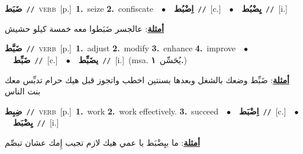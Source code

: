 \documentclass[10pt,a4paper,twoside]{article} %
\begin{document}
\begin{multicols}{2}
{\setlength\topsep{0pt}\textbf{\foreignlanguage{arabic}{ضَبَط}}\ {\color{gray}\texttt{//}\color{black}}\ \textsc{verb}\ [p.]\ \textbf{1.}~seize  \textbf{2.}~confiscate\ \ $\bullet$\ \ \setlength\topsep{0pt}\textbf{\foreignlanguage{arabic}{اِضْبُط}}\ {\color{gray}\texttt{//}\color{black}}\ [c.]\ \ $\bullet$\ \ \setlength\topsep{0pt}\textbf{\foreignlanguage{arabic}{يِضْبُط}}\ {\color{gray}\texttt{//}\color{black}}\ [i.]\  \begin{flushright}\color{gray}\foreignlanguage{arabic}{\textbf{\underline{\foreignlanguage{arabic}{أمثلة}}}: عالجسر ضَبَطوا معه خمسة كيلو حشيش}\end{flushright}\color{black}} \vspace{2mm}

{\setlength\topsep{0pt}\textbf{\foreignlanguage{arabic}{ضَبَّط}}\ {\color{gray}\texttt{//}\color{black}}\ \textsc{verb}\ [p.]\ \textbf{1.}~adjust  \textbf{2.}~modify  \textbf{3.}~enhance  \textbf{4.}~improve\ \ $\bullet$\ \ \setlength\topsep{0pt}\textbf{\foreignlanguage{arabic}{ضَبِّط}}\ {\color{gray}\texttt{//}\color{black}}\ [c.]\ \ $\bullet$\ \ \setlength\topsep{0pt}\textbf{\foreignlanguage{arabic}{يضَبِّط}}\ {\color{gray}\texttt{//}\color{black}}\ [i.]\ \color{gray}(msa. \foreignlanguage{arabic}{يُحَسِّن}~\foreignlanguage{arabic}{\textbf{١.}})\color{black}\  \begin{flushright}\color{gray}\foreignlanguage{arabic}{\textbf{\underline{\foreignlanguage{arabic}{أمثلة}}}: ضَبِّط وضعك بالشغل وبعدها بسنتين اخطب واتجوز قبل هيك حرام تدبِّس معك بنت الناس}\end{flushright}\color{black}} \vspace{2mm}

{\setlength\topsep{0pt}\textbf{\foreignlanguage{arabic}{ضِبِط}}\ {\color{gray}\texttt{//}\color{black}}\ \textsc{verb}\ [p.]\ \textbf{1.}~work  \textbf{2.}~work effectively.  \textbf{3.}~succeed\ \ $\bullet$\ \ \setlength\topsep{0pt}\textbf{\foreignlanguage{arabic}{اِضْبَط}}\ {\color{gray}\texttt{//}\color{black}}\ [c.]\ \ $\bullet$\ \ \setlength\topsep{0pt}\textbf{\foreignlanguage{arabic}{يِضْبَط}}\ {\color{gray}\texttt{//}\color{black}}\ [i.]\  \begin{flushright}\color{gray}\foreignlanguage{arabic}{\textbf{\underline{\foreignlanguage{arabic}{أمثلة}}}: ما بيِضْبَط يا عمي هيك لازم تجيب إِمك عشان تبصِّم}\end{flushright}\color{black}} \vspace{2mm}


\end{multicols}
\end{document}
